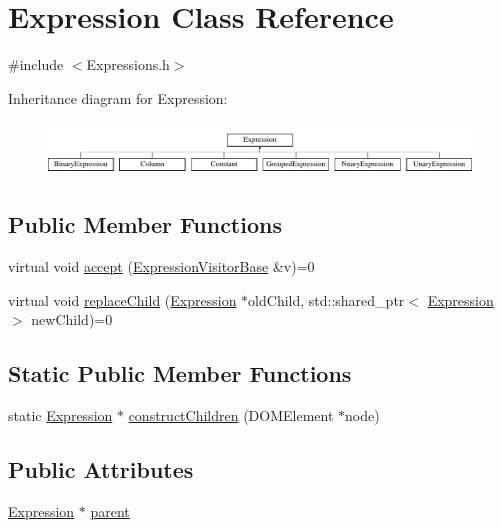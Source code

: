 \hypertarget{class_expression}{\section{Expression Class Reference}
\label{class_expression}
}


{\ttfamily \#include $<$Expressions.\+h$>$}

Inheritance diagram for Expression\+:\begin{figure}[H]
\begin{center}
\leavevmode
\includegraphics[height=1.424936cm]{class_expression}
\end{center}
\end{figure}
\subsection*{Public Member Functions}
\begin{DoxyCompactItemize}
\item 
virtual void \hyperlink{class_expression_ae2e6c802668a6329658b7c982f9c7b33}{accept} (\hyperlink{class_expression_visitor_base}{Expression\+Visitor\+Base} \&v)=0
\item 
virtual void \hyperlink{class_expression_a77ac16bbb0df93de8a7711b2f7de889f}{replace\+Child} (\hyperlink{class_expression}{Expression} $\ast$old\+Child, std\+::shared\+\_\+ptr$<$ \hyperlink{class_expression}{Expression} $>$ new\+Child)=0
\end{DoxyCompactItemize}
\subsection*{Static Public Member Functions}
\begin{DoxyCompactItemize}
\item 
static \hyperlink{class_expression}{Expression} $\ast$ \hyperlink{class_expression_ae1968c4b3272019059f9a51e40d65c41}{construct\+Children} (D\+O\+M\+Element $\ast$node)
\end{DoxyCompactItemize}
\subsection*{Public Attributes}
\begin{DoxyCompactItemize}
\item 
\hyperlink{class_expression}{Expression} $\ast$ \hyperlink{class_expression_a36284ba467eae6aa796985ed909a6958}{parent}
\end{DoxyCompactItemize}


